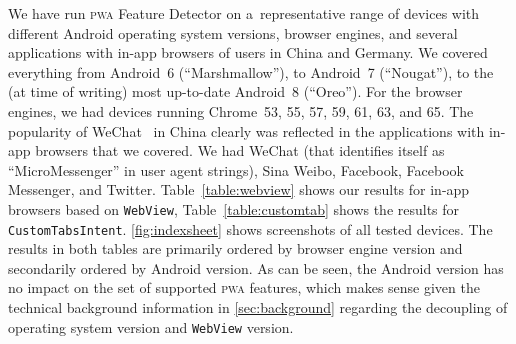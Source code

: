 \documentclass[sigconf]{acmart}
\begin{document}
We have run \textsc{pwa} Feature Detector on a~representative range of devices
with different Android operating system versions, browser engines,
and several applications with in-app browsers of users in China and Germany.
We covered everything from Android~6 (``Marshmallow''),
to Android~7 (``Nougat''),
to the (at time of writing) most up-to-date Android~8 (``Oreo''). 
For the browser engines, we had devices running Chrome~53, 55, 57, 59, 61, 63, and 65.
The popularity of WeChat~\cite{chan2015wechat} in China clearly was reflected 
in the applications with in-app browsers that we covered.
We had WeChat (that identifies itself as ``MicroMessenger'' in user agent strings),
Sina Weibo, Facebook, Facebook Messenger, and Twitter.
Table~\ref{table:webview} shows our results for in-app browsers based on
\texttt{WebView}, Table~\ref{table:customtab} shows the results for
\texttt{CustomTabsIntent}.
\autoref{fig:indexsheet} shows screenshots of all tested devices.
The results in both tables are primarily ordered by browser engine version
and secondarily ordered by Android version.
As can be seen, the Android version has no impact
on the set of supported \textsc{pwa} features,
which makes sense given the technical background information
in \autoref{sec:background} regarding the decoupling of operating system version
and \texttt{WebView} version.
\end{document}
